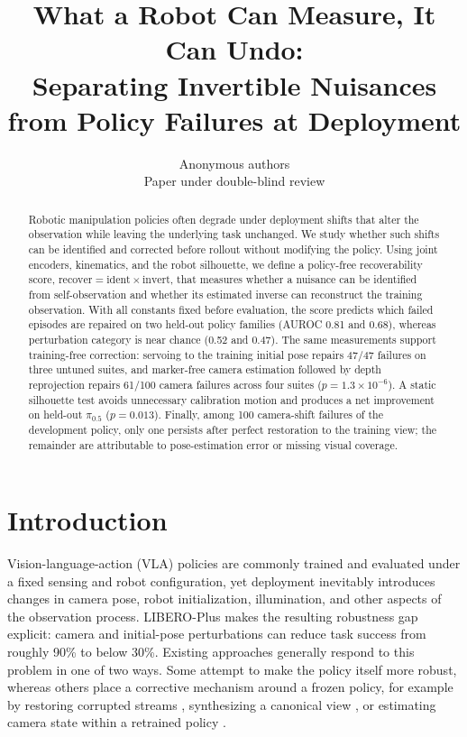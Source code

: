\documentclass{article}
\title{What a Robot Can Measure, It Can Undo:\\ Separating Invertible Nuisances from Policy Failures at Deployment}
\author{Anonymous authors\\ Paper under double-blind review}
\newcommand{\ident}{\mathrm{ident}}
\newcommand{\invert}{\mathrm{invert}}
\newcommand{\recover}{\mathrm{recover}}
\begin{document}
\maketitle

\begin{abstract}
Robotic manipulation policies often degrade under deployment shifts that alter the observation while leaving the
underlying task unchanged. We study whether such shifts can be identified and corrected before rollout without
modifying the policy. Using joint encoders, kinematics, and the robot silhouette, we define a policy-free
recoverability score, $\recover=\ident\times\invert$, that measures whether a nuisance can be identified from
self-observation and whether its estimated inverse can reconstruct the training observation. With all constants fixed
before evaluation, the score predicts which failed episodes are repaired on two held-out policy families (AUROC 0.81
and 0.68), whereas perturbation category is near chance (0.52 and 0.47). The same measurements support training-free
correction: servoing to the training initial pose repairs 47/47 failures on three untuned suites, and marker-free
camera estimation followed by depth reprojection repairs 61/100 camera failures across four suites
($p=1.3\times10^{-6}$). A static silhouette test avoids unnecessary calibration motion and produces a net improvement
on held-out $\pi_{0.5}$ ($p=0.013$). Finally, among 100 camera-shift failures of the development policy, only one
persists after perfect restoration to the training view; the remainder are attributable to pose-estimation error or
missing visual coverage.
\end{abstract}

\section{Introduction}

Vision-language-action (VLA) policies are commonly trained and evaluated under a fixed sensing and robot configuration,
yet deployment inevitably introduces changes in camera pose, robot initialization, illumination, and other aspects of
the observation process. LIBERO-Plus \citep{liberoplus} makes the resulting robustness gap explicit: camera and
initial-pose perturbations can reduce task success from roughly 90\% to below 30\%. Existing approaches generally respond
to this problem in one of two ways. Some attempt to make the policy itself more robust, whereas others place a corrective
mechanism around a frozen policy, for example by restoring corrupted streams \citep{rightstream,crt,byovla}, synthesizing
a canonical view \citep{anycamvla,vistabot,gsvla}, or estimating camera state within a retrained policy
\citep{fixedtofree}.
\end{document}
